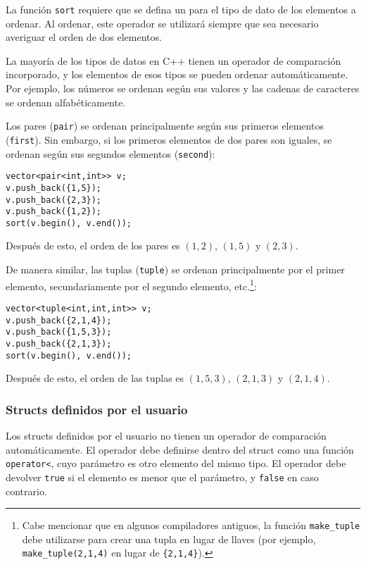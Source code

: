 
La función \texttt{sort} requiere que
se defina un  para el tipo de dato
de los elementos a ordenar.
Al ordenar, este operador se utilizará
siempre que sea necesario averiguar el orden de dos elementos.

La mayoría de los tipos de datos en C++ tienen un operador de comparación incorporado,
y los elementos de esos tipos se pueden ordenar automáticamente.
Por ejemplo, los números se ordenan según sus valores
y las cadenas de caracteres se ordenan alfabéticamente.


Los pares (\texttt{pair}) se ordenan principalmente según sus
primeros elementos (\texttt{first}).
Sin embargo, si los primeros elementos de dos pares son iguales,
se ordenan según sus segundos elementos (\texttt{second}):
\begin{lstlisting}
vector<pair<int,int>> v;
v.push_back({1,5});
v.push_back({2,3});
v.push_back({1,2});
sort(v.begin(), v.end());
\end{lstlisting}
Después de esto, el orden de los pares es
$(1,2)$, $(1,5)$ y $(2,3)$.


De manera similar, las tuplas (\texttt{tuple})
se ordenan principalmente por el primer elemento,
secundariamente por el segundo elemento, etc.\footnote{Cabe mencionar que en algunos compiladores antiguos,
la función \texttt{make\_tuple} debe utilizarse para crear una tupla en lugar de
llaves (por ejemplo, \texttt{make\_tuple(2,1,4)} en lugar de \texttt{\{2,1,4\}}).}:
\begin{lstlisting}
vector<tuple<int,int,int>> v;
v.push_back({2,1,4});
v.push_back({1,5,3});
v.push_back({2,1,3});
sort(v.begin(), v.end());
\end{lstlisting}
Después de esto, el orden de las tuplas es
$(1,5,3)$, $(2,1,3)$ y $(2,1,4)$.

\subsubsection{Structs definidos por el usuario}

Los structs definidos por el usuario no tienen un operador de comparación
automáticamente.
El operador debe definirse dentro
del struct como una función
\texttt{operator<},
cuyo parámetro es otro elemento del mismo tipo.
El operador debe devolver \texttt{true}
si el elemento es menor que el parámetro,
y \texttt{false} en caso contrario.

